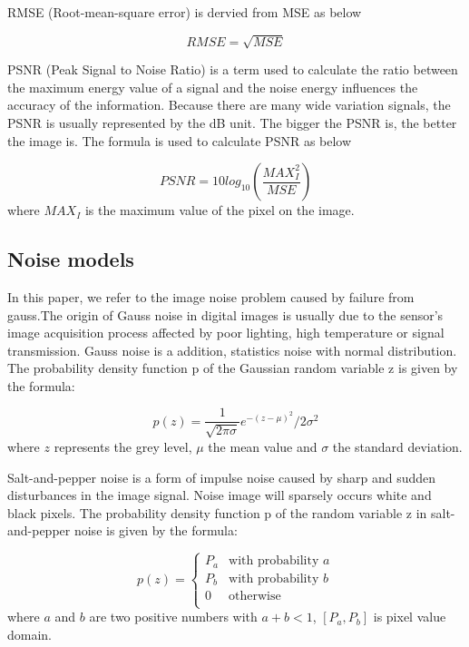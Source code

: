 RMSE (Root-mean-square error) is dervied from MSE as below

\begin{equation}
    \label{eq:rmse}
    RMSE = \sqrt{MSE}
\end{equation}

PSNR (Peak Signal to Noise Ratio) is a term used to calculate the ratio between the maximum energy value of a signal and the noise energy influences the accuracy of the information. Because there are many wide variation signals, the PSNR is usually represented by the dB unit. The bigger the PSNR is, the better the image is. The formula is used to calculate PSNR as below

\begin{equation}
    \label{eq:psnr}
    PSNR = 10log_{10}\left(\frac{MAX_{I}^{2}}{MSE}\right)
\end{equation}
where $MAX_{I}$ is the maximum value of the pixel on the image.

\subsection{Noise models}
In this paper, we refer to the image noise problem caused by failure from gauss.The origin of Gauss noise in digital images is usually due to the sensor's image acquisition process affected by poor lighting, high temperature or signal transmission. Gauss noise is a addition, statistics noise with normal distribution. The probability density function p of the Gaussian random variable z is given by the formula\cite{Gonzalez06DIP}:

\begin{equation}
    \label{eq:gauss_noise}
    p\left(z\right) = \frac{1}{\sqrt{2\pi\sigma}}e^{-\left(z-\mu\right)^{2}}/2\sigma^{2}
\end{equation}
where $z$ represents the grey level, $\mu$  the mean value and $\sigma$  the standard deviation.

Salt-and-pepper noise is a form of impulse noise caused by sharp and sudden disturbances in the image signal. Noise image will sparsely occurs white and black pixels.  The probability density function p of the random variable z in salt-and-pepper noise is given by the formula\cite{Gonzalez06DIP}:

\begin{equation}
    \label{eq:salt_and_pepper}
    p\left(z\right) = \left\{\begin{matrix}
    P_{a} & \text{with probability } a\\
    P_{b} & \text{with probability } b\\
    0 & \text{otherwise}\\
    \end{matrix}\right. 
\end{equation}
where $a$ and $b$ are two positive numbers with $a+b<1$, $\left[ P_{a}, P_{b}\right]$ is pixel value domain.

